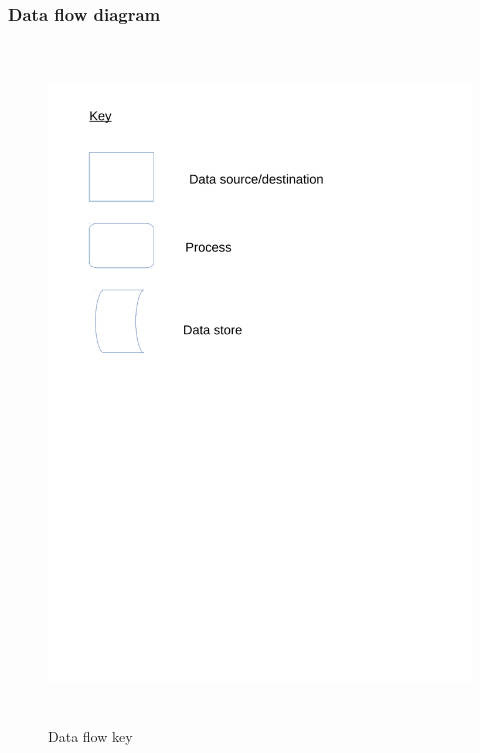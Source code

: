 \newpage

\subsubsection{Data flow diagram}

\begin{figure}[H]
    \includegraphics[height = 18cm]{./Analysis/Dataflowkey}
    \caption{Data flow key} \label{fig:flow_key}
\end{figure}

